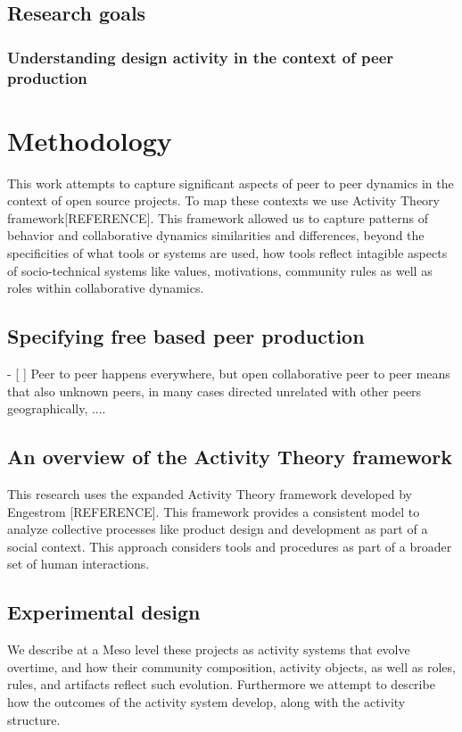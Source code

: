 \documentclass{ICED-Paper}%
\begin{document}
\subsection{Research goals}

\subsubsection{Understanding design activity in the context of peer production}

\section{Methodology}
This work attempts to capture significant aspects of peer to peer dynamics in the context of open source projects. To map these contexts we use Activity Theory framework[REFERENCE]. This framework allowed us to capture patterns of behavior and collaborative dynamics similarities and differences, beyond the specificities of what tools or systems are used, how tools reflect intagible aspects of socio-technical systems like values, motivations, community rules as well as roles within collaborative dynamics.
\subsection{Specifying free based peer production}
- [ ] Peer to peer happens everywhere, but open collaborative peer to peer means that also unknown peers, in many cases directed unrelated with other peers geographically, ....
\subsection{An overview of  the Activity Theory framework}
This research uses the expanded Activity Theory framework developed by Engestrom [REFERENCE]. This framework provides a consistent model to analyze collective processes like product design and development as part of a social context. This approach considers tools and procedures as part of a broader set of human interactions.
\subsection{Experimental design}

We describe at a Meso level these projects as activity  systems that evolve overtime, and how their community composition, activity objects, as well as roles, rules, and artifacts reflect such evolution. Furthermore we attempt to describe how the outcomes of the activity system develop, along with the activity structure.
\end{document}
